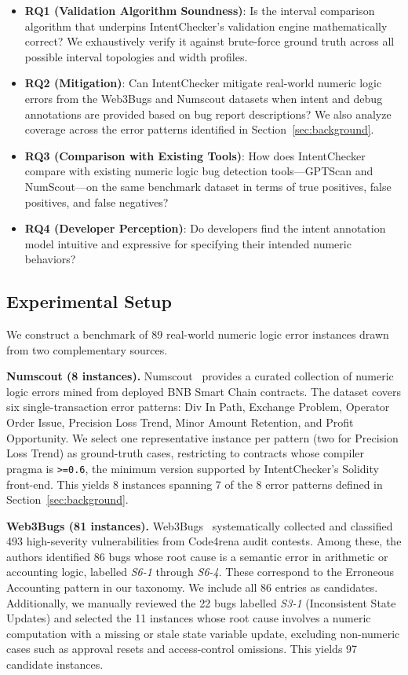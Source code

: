 \documentclass[pdflatex,sn-basic]{sn-jnl}%
\theoremstyle{thmstyleone}%
\theoremstyle{thmstyletwo}%
\theoremstyle{thmstylethree}%
\begin{document}
\begin{itemize}
    \item \textbf{RQ1 (Validation Algorithm Soundness)}: Is the interval comparison algorithm that underpins IntentChecker's validation engine mathematically correct? We exhaustively verify it against brute-force ground truth across all possible interval topologies and width profiles.
    \item \textbf{RQ2 (Mitigation)}: Can IntentChecker mitigate real-world numeric logic errors from the Web3Bugs and Numscout datasets when intent and debug annotations are provided based on bug report descriptions? We also analyze coverage across the error patterns identified in Section~\ref{sec:background}.
    \item \textbf{RQ3 (Comparison with Existing Tools)}: How does IntentChecker compare with existing numeric logic bug detection tools---GPTScan and NumScout---on the same benchmark dataset in terms of true positives, false positives, and false negatives?
    \item \textbf{RQ4 (Developer Perception)}: Do developers find the intent annotation model intuitive and expressive for specifying their intended numeric behaviors?
\end{itemize}

\subsection{Experimental Setup}\label{sec:setup}

We construct a benchmark of 89 real-world numeric logic error instances drawn from two complementary sources.

\smallskip\noindent\textbf{Numscout (8 instances).}
Numscout~\citep{numscout} provides a curated collection of numeric logic errors mined from deployed BNB Smart Chain contracts.
The dataset covers six single-transaction error patterns: Div In Path, Exchange Problem, Operator Order Issue, Precision Loss Trend, Minor Amount Retention, and Profit Opportunity.
We select one representative instance per pattern (two for Precision Loss Trend) as ground-truth cases, restricting to contracts whose compiler pragma is \texttt{>=0.6}, the minimum version supported by IntentChecker's Solidity front-end.
This yields 8 instances spanning 7 of the 8 error patterns defined in Section~\ref{sec:background}.

\smallskip\noindent\textbf{Web3Bugs (81 instances).}
Web3Bugs~\citep{exploitablebugs} systematically collected and classified 493 high-severity vulnerabilities from Code4rena audit contests.
Among these, the authors identified 86 bugs whose root cause is a semantic error in arithmetic or accounting logic, labelled \textit{S6-1} through \textit{S6-4}.
These correspond to the Erroneous Accounting pattern in our taxonomy.
We include all 86 entries as candidates.
Additionally, we manually reviewed the 22 bugs labelled \textit{S3-1} (Inconsistent State Updates) and selected the 11 instances whose root cause involves a numeric computation with a missing or stale state variable update, excluding non-numeric cases such as approval resets and access-control omissions.
This yields 97 candidate instances.
\end{document}
